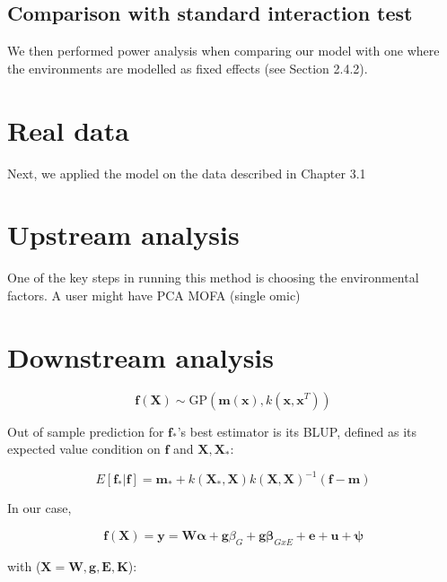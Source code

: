 \subsection{Comparison with standard interaction test}

We then performed power analysis when comparing our model with one where the environments are modelled as fixed effects (see Section 2.4.2).

\newpage

\section{Real data}

Next, we applied the model on the data described in Chapter 3.1

\section{Upstream analysis}

One of the key steps in running this method is choosing the environmental factors.
A user might have 
PCA
MOFA (single omic)

\section{Downstream analysis} 

\begin{equation}
    \mathbf{f}(\mathbf{X}) \sim \mathrm{GP}(\mathbf{m}(\mathbf{x}), k(\mathbf{x},\mathbf{x}^T))
\end{equation}

Out of sample prediction for $\mathbf{f}_*$'s best estimator is its BLUP, defined as its expected value condition on $\mathbf{f}$ and $\mathbf{X},\mathbf{X}_*$:

\begin{equation}
    E[\mathbf{f}_*|\mathbf{f}] = \mathbf{m}_* +k(\mathbf{X}_*,\mathbf{X})k(\mathbf{X},\mathbf{X})^{-1}(\mathbf{f}-\mathbf{m})
\end{equation}

In our case,

\begin{equation}
    \mathbf{f}(\mathbf{X}) = \mathbf{y} = \mathbf{W}\boldsymbol{\alpha}+\mathbf{g}\beta_G+\mathbf{g}\boldsymbol{\beta}_{GxE}+\mathbf{e} + \mathbf{u} + \boldsymbol{\psi}
\end{equation}

with ($\mathbf{X} = {\mathbf{W},\mathbf{g},\mathbf{E},\mathbf{K}}$):

